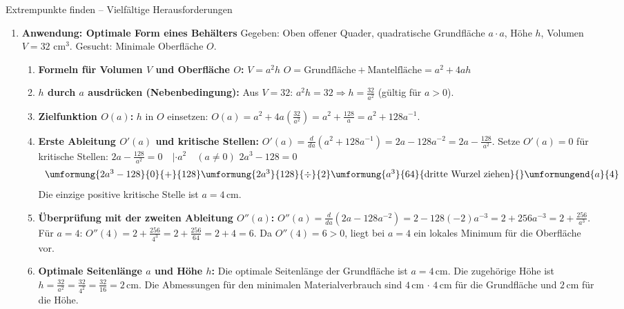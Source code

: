 \begin{loesungsumgebung}{Extrempunkte finden – Vielfältige Herausforderungen}
\begin{enumerate}[label=(\alph*)]
    \item \textbf{Anwendung: Optimale Form eines Behälters}
    Gegeben: Oben offener Quader, quadratische Grundfläche $a \cdot a$, Höhe $h$, Volumen $V=32 \text{ cm}^3$. Gesucht: Minimale Oberfläche $O$.
    \begin{enumerate}[label=(\roman*)]
        \item \textbf{Formeln für Volumen $V$ und Oberfläche $O$:}
        $V = a^2 h$
        $O = \text{Grundfläche} + \text{Mantelfläche} = a^2 + 4ah$
        \item \textbf{$h$ durch $a$ ausdrücken (Nebenbedingung):}
        Aus $V=32$: $a^2h = 32 \Rightarrow h = \frac{32}{a^2}$ (gültig für $a>0$).
        \item \textbf{Zielfunktion $O(a)$:}
        $h$ in $O$ einsetzen:
        $O(a) = a^2 + 4a \left(\frac{32}{a^2}\right) = a^2 + \frac{128}{a} = a^2 + 128a^{-1}$.
        \item \textbf{Erste Ableitung $O'(a)$ und kritische Stellen:}
        $O'(a) = \frac{d}{da}(a^2 + 128a^{-1}) = 2a - 128a^{-2} = 2a - \frac{128}{a^2}$.
        Setze $O'(a)=0$ für kritische Stellen:
        $2a - \frac{128}{a^2} = 0 \quad | \cdot a^2 \quad (a \neq 0)$
        $2a^3 - 128 = 0$
        $$
        \begin{array}{r c l c l}
        \umformung{2a^3 - 128}{0}{+}{128}
        \umformung{2a^3}{128}{\div}{2}
        \umformung{a^3}{64}{\text{dritte Wurzel ziehen}}{}
        \umformungend{a}{4}
        \end{array}
        $$
        Die einzige positive kritische Stelle ist $a=4\,$cm.
        \item \textbf{Überprüfung mit der zweiten Ableitung $O''(a)$:}
        $O''(a) = \frac{d}{da}(2a - 128a^{-2}) = 2 - 128(-2)a^{-3} = 2 + 256a^{-3} = 2 + \frac{256}{a^3}$.
        Für $a=4$: $O''(4) = 2 + \frac{256}{4^3} = 2 + \frac{256}{64} = 2 + 4 = 6$.
        Da $O''(4) = 6 > 0$, liegt bei $a=4$ ein lokales Minimum für die Oberfläche vor.
        \item \textbf{Optimale Seitenlänge $a$ und Höhe $h$:}
        Die optimale Seitenlänge der Grundfläche ist $a = 4\,$cm.
        Die zugehörige Höhe ist $h = \frac{32}{a^2} = \frac{32}{4^2} = \frac{32}{16} = 2\,$cm.
        Die Abmessungen für den minimalen Materialverbrauch sind $4\,$cm $\cdot$ $4\,$cm für die Grundfläche und $2\,$cm für die Höhe.
    \end{enumerate}
\end{enumerate}

\end{loesungsumgebung}

